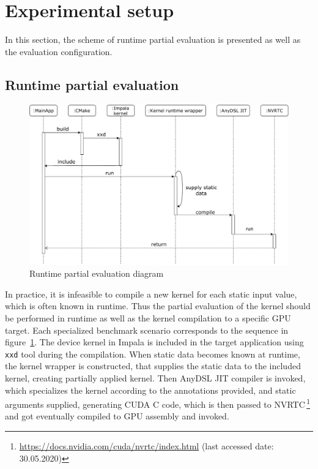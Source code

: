 \section{Experimental setup}
In this section, the scheme of runtime partial evaluation is presented as well as the evaluation configuration.

\subsection{Runtime partial evaluation}

\begin{figure}
    \centering
    \includegraphics[width=\linewidth]{figures/SeqDiagram.pdf}
    \caption{Runtime partial evaluation diagram}
    \label{fig:seq_pe}
\end{figure}

In practice, it is infeasible to compile a new kernel for each static input 
value, which is often known in runtime. Thus the partial evaluation of the 
kernel should be performed in runtime as well as the kernel compilation to 
a specific GPU target.
Each specialized benchmark scenario corresponds to the sequence in 
figure~\ref{fig:seq_pe}. The device kernel in Impala is included in the 
target application using \lstinline{xxd} tool during the compilation. 
When static data becomes known at runtime, the kernel wrapper is constructed, 
that supplies the static data to the included kernel, 
creating partially applied kernel. Then AnyDSL JIT compiler is invoked, 
which specializes the kernel according to the annotations provided, 
and static arguments supplied, generating CUDA C code, which is then passed 
to NVRTC\,\footnote{\url{https://docs.nvidia.com/cuda/nvrtc/index.html} (last accessed date: 30.05.2020)} 
and got eventually compiled to GPU assembly and invoked.

